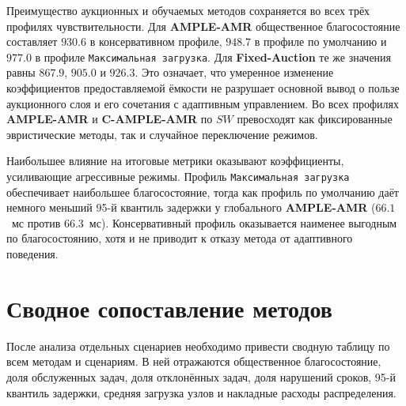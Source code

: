 

Преимущество аукционных и обучаемых методов сохраняется во всех трёх профилях чувствительности. Для \textbf{AMPLE-AMR} общественное благосостояние составляет $930.6$ в консервативном профиле, $948.7$ в профиле по умолчанию и $977.0$ в профиле \texttt{Максимальная загрузка}. Для \textbf{Fixed-Auction} те же значения равны $867.9$, $905.0$ и $926.3$. Это означает, что умеренное изменение коэффициентов предоставляемой ёмкости не разрушает основной вывод о пользе аукционного слоя и его сочетания с адаптивным управлением. Во всех профилях \textbf{AMPLE-AMR} и \textbf{C-AMPLE-AMR} по $SW$ превосходят как фиксированные эвристические методы, так и случайное переключение режимов.

Наибольшее влияние на итоговые метрики оказывают коэффициенты, усиливающие агрессивные режимы. Профиль \texttt{Максимальная загрузка} обеспечивает наибольшее благосостояние, тогда как профиль по умолчанию даёт немного меньший 95-й квантиль задержки у глобального \textbf{AMPLE-AMR} ($66.1$~мс против $66.3$~мс). Консервативный профиль оказывается наименее выгодным по благосостоянию, хотя и не приводит к отказу метода от адаптивного поведения.

\section{Сводное сопоставление методов}

После анализа отдельных сценариев необходимо привести сводную таблицу по всем методам и сценариям. В ней отражаются общественное благосостояние, доля обслуженных задач, доля отклонённых задач, доля нарушений сроков, 95-й квантиль задержки, средняя загрузка узлов и накладные расходы распределения.




